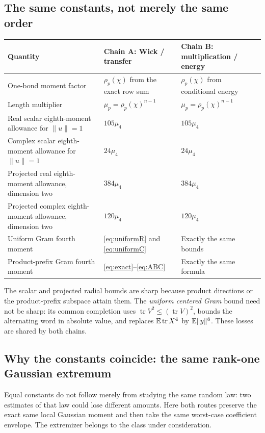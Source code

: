 \documentclass[11pt]{article}
\numberwithin{equation}{section}
\theoremstyle{definition}\newtheorem{definition}[theorem]{Definition}
\theoremstyle{remark}\newtheorem{remark}[theorem]{Remark}
\newcommand{\tr}{\operatorname{tr}}\newcommand{\Ent}{\operatorname{Ent}}
\newcommand{\norm}[1]{\lVert#1\rVert}\newcommand{\ip}[2]{\langle#1,#2\rangle}
\begin{document}
\subsection{The same constants, not merely the same order}
\begingroup\small\setlength{\tabcolsep}{5pt}\renewcommand{\arraystretch}{1.25}
\begin{tabularx}{\textwidth}{@{}P{.33\textwidth}YY@{}}
\toprule
\textbf{Quantity}&\textbf{Chain A: Wick / transfer}&\textbf{Chain B: multiplication / energy}\\
\midrule
One-bond moment factor&$\rho_p(\chi)$ from the exact row sum&$\rho_p(\chi)$ from conditional energy\\
Length multiplier&$\mu_p=\rho_p(\chi)^{n-1}$&$\mu_p=\rho_p(\chi)^{n-1}$\\
Real scalar eighth-moment allowance for $\norm u=1$&$105\mu_4$&$105\mu_4$\\
Complex scalar eighth-moment allowance for $\norm u=1$&$24\mu_4$&$24\mu_4$\\
Projected real eighth-moment allowance, dimension two&$384\mu_4$&$384\mu_4$\\
Projected complex eighth-moment allowance, dimension two&$120\mu_4$&$120\mu_4$\\
Uniform Gram fourth moment&\eqref{eq:uniformR} and \eqref{eq:uniformC}&Exactly the same bounds\\
Product-prefix Gram fourth moment&\eqref{eq:exact}--\eqref{eq:ABC}&Exactly the same formula\\
\bottomrule
\end{tabularx}
\endgroup

The scalar and projected radial bounds are sharp because product directions
or the product-prefix subspace attain them. The \emph{uniform centered Gram}
bound need not be sharp: its common completion uses
$\tr V^2\le(\tr V)^2$, bounds the alternating word in absolute value, and
replaces $\E\tr X^4$ by $\E\norm y^8$. These losses are shared by both chains.


\subsection{Why the constants coincide: the same rank-one Gaussian extremum}
\label{subsec:equalconstants}
Equal constants do not follow merely from studying the same random law: two
estimates of that law could lose different amounts. Here both routes preserve
the exact same local Gaussian moment and then take the same worst-case
coefficient envelope. The extremizer belongs to the class under consideration.
\end{document}
